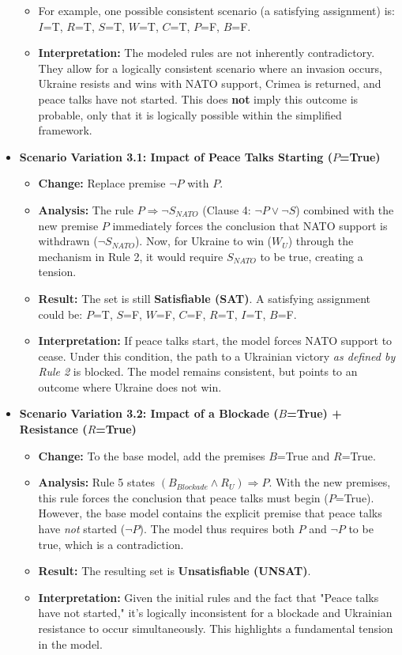 \documentclass[11pt, a4paper]{article}
\begin{document}
\begin{itemize}
\begin{itemize}
            \item For example, one possible consistent scenario (a satisfying assignment) is: $I$=T, $R$=T, $S$=T, $W$=T, $C$=T, $P$=F, $B$=F.
            \item \textbf{Interpretation:} The modeled rules are not inherently contradictory. They allow for a logically consistent scenario where an invasion occurs, Ukraine resists and wins with NATO support, Crimea is returned, and peace talks have not started. This does \textbf{not} imply this outcome is probable, only that it is logically possible within the simplified framework.
        \end{itemize}
    \item \textbf{Scenario Variation 3.1: Impact of Peace Talks Starting ($P$=True)}
        \begin{itemize}
            \item \textbf{Change:} Replace premise $\neg P$ with $P$.
            \item \textbf{Analysis:} The rule $P \Rightarrow \neg S_{NATO}$ (Clause 4: $\neg P \vee \neg S$) combined with the new premise $P$ immediately forces the conclusion that NATO support is withdrawn ($\neg S_{NATO}$). Now, for Ukraine to win ($W_U$) through the mechanism in Rule 2, it would require $S_{NATO}$ to be true, creating a tension.
            \item \textbf{Result:} The set is still \textbf{Satisfiable (SAT)}. A satisfying assignment could be: $P$=T, $S$=F, $W$=F, $C$=F, $R$=T, $I$=T, $B$=F.
            \item \textbf{Interpretation:} If peace talks start, the model forces NATO support to cease. Under this condition, the path to a Ukrainian victory \textit{as defined by Rule 2} is blocked. The model remains consistent, but points to an outcome where Ukraine does not win.
        \end{itemize}
    \item \textbf{Scenario Variation 3.2: Impact of a Blockade ($B$=True) + Resistance ($R$=True)}
        \begin{itemize}
            \item \textbf{Change:} To the base model, add the premises $B$=True and $R$=True.
            \item \textbf{Analysis:} Rule 5 states $(B_{Blockade} \wedge R_U) \Rightarrow P$. With the new premises, this rule forces the conclusion that peace talks must begin ($P$=True). However, the base model contains the explicit premise that peace talks have \textit{not} started ($\neg P$). The model thus requires both $P$ and $\neg P$ to be true, which is a contradiction.
            \item \textbf{Result:} The resulting set is \textbf{Unsatisfiable (UNSAT)}.
            \item \textbf{Interpretation:} Given the initial rules and the fact that "Peace talks have not started," it's logically inconsistent for a blockade and Ukrainian resistance to occur simultaneously. This highlights a fundamental tension in the model.
        \end{itemize}
\end{itemize}
\end{document}
